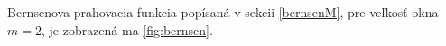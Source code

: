 \documentclass[a4paper,11pt,oneside]{article}%
\begin{document}
Bernsenova prahovacia funkcia popísaná v sekcii \ref{bernsenM}, pre veľkosť okna $m = 2$, je zobrazená ma \ref{fig:bernsen}.

\begin{figure}[H]  
    \hspace{5px}

\end{figure}
\end{document}
